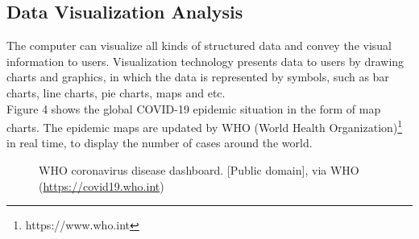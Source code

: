 \documentclass[sigplan,screen]{acmart}
\begin{document}
\subsection{Data Visualization Analysis}
The computer can visualize all kinds of structured data and convey the visual information to users.
Visualization technology presents data to users by drawing charts and graphics, in which the data is represented by symbols, such as bar charts, line charts, pie charts, maps and etc\cite{jensen1992harvard}.
\\
Figure 4 shows the global COVID-19 epidemic situation in the form of map charts. The epidemic maps are updated by WHO (World Health Organization)\footnote{https://www.who.int} in real time, to display the number of cases around the world.
\begin{figure}[htb]
	\centering
	\caption{WHO coronavirus disease dashboard. [Public domain], via WHO (\url{https://covid19.who.int})}
\end{figure}
\end{document}
